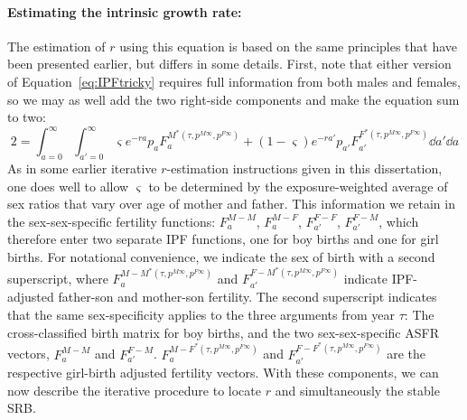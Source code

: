 \paragraph{Estimating the intrinsic growth rate: } The estimation of
$r$ using this equation is based on the same principles that have been presented
earlier, but differs in some details. First, note
that either version of Equation~\eqref{eq:IPFtricky} requires full information from both
males and females, so we may as well add the two right-side components and make
the equation sum to two:
\begin{equation}
\label{eq:IPFugly}
2 = \int_{a=0}^\infty \int_{a'=0}^\infty \varsigma
e^{-ra}p_aF_a^{M^\ast(\tau,p^{M\infty}, p^{F\infty})} + (1-\varsigma)
e^{-ra'}p_{a'}F_{a'}^{F^\ast(\tau,p^{M\infty}, p^{F\infty})}\dd a' \dd a
\end{equation}
As in some earlier iterative $r$-estimation instructions given in this
dissertation, one does well to allow $\varsigma$ to be determined by the
exposure-weighted average of sex ratios that vary over age of mother and father.
This information we retain in the sex-sex-specific fertility functions: $F_a^{M-M}$,
$F_a^{M-F}$, $F_{a'}^{F-F}$, $F_{a'}^{F-M}$, which therefore enter two
separate IPF functions, one for boy births and one for girl births. For
notational convenience, we indicate the sex of birth with a second superscript,
where $F_a^{M-M^\ast(\tau,p^{M\infty}, p^{F\infty})}$ and
$F_{a'}^{F-M^\ast(\tau,p^{M\infty}, p^{F\infty})}$ indicate IPF-adjusted
father-son and mother-son fertility. The second superscript indicates that
the same sex-specificity applies to the three arguments from year $\tau$: The 
cross-classified birth matrix for boy births, and the two sex-sex-specific ASFR
vectors, $F_a^{M-M}$ and $F_{a'}^{F-M}$.  $F_a^{M-F^\ast(\tau,p^{M\infty},
p^{F\infty})}$ and $F_{a'}^{F-F^\ast(\tau,p^{M\infty}, p^{F\infty})}$ are the
respective girl-birth adjusted fertility vectors. With these components, we can
now describe the iterative procedure to locate $r$ and simultaneously the stable
SRB.

